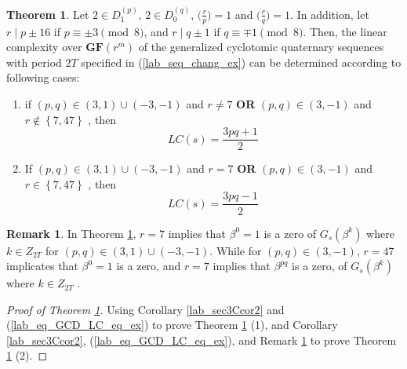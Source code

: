 \documentclass{mcom-l}
\theoremstyle{definition}
\newtheorem{sec3Cremark2}[sec3_remark1]{Remark}
\newtheorem{sec3CThm02}[sec3thm1]{Theorem}
\numberwithin{equation}{section}
\begin{document}
       \begin{sec3CThm02}\label{lab_sec3CThm02}
         Let $ 2\in D_{1}^{(p)} $, $ 2\in D_{0}^{(q)} $, $ \bigl(\tfrac{r}{p}\bigr) =1$ and $ \bigl(\tfrac{r}{q}\bigr) =1$. In addition, let  $ r\mid p\pm 16 $ if $ p\equiv\pm 3\pmod 8 $, and $ r\mid q\pm 1 $ if $ q\equiv\mp 1\pmod 8 $.
         Then, the linear complexity over $ \mathbf{GF}(r^{m}) $ of the generalized cyclotomic quaternary sequences with period $ 2T $ specified in (\ref{lab_seq_chang_ex}) can be determined according to following cases: 
      \begin{enumerate} \item if $ (p,q)\in (3,1)\cup (-3,-1) $ and  $r\ne 7$ \textbf{OR} $ (p,q)\in (3,-1) $ and $r\notin \left\lbrace 7,47\right\rbrace$ , then 
      \begin{equation*}
       LC(s)=\frac{3pq+1}{2}
       \end{equation*}
      
        \item If $ (p,q)\in (3,1)\cup (-3,-1) $ and  $r=7$ \textbf{OR} $ (p,q)\in (3,-1) $ and $r\in \left\lbrace 7,47\right\rbrace$ , then 
    \begin{equation*}
       LC(s)=\frac{3pq-1}{2}
       \end{equation*}
      
    \end{enumerate}
     \end{sec3CThm02}
     \begin{sec3Cremark2}\label{Lab_sec3Cremark2}
     In Theorem \ref{lab_sec3CThm02},  $r=7$ implies that $ \beta^{0}=1 $ is a zero of $ G_{s}(\beta^{k}) $ where $ k\in Z_{2T} $ for $ (p,q)\in (3,1)\cup (-3,-1) $. While for $ (p,q)\in (3,-1) $, $r=47$ implicates that $ \beta^{0}=1 $ is a zero, and $r=7$ implies that $ \beta^{pq}$ is a zero, of $ G_{s}(\beta^{k}) $ where $ k\in Z_{2T} $ .
     \end{sec3Cremark2}
     \begin{proof}[Proof of Theorem \ref{lab_sec3CThm02}]
         Using Corollary \ref{lab_sec3Ccor2} and (\ref{lab_eq_GCD_LC_eq_ex}) to prove Theorem \ref{lab_sec3CThm02} (1), and  Corollary \ref{lab_sec3Ccor2}, (\ref{lab_eq_GCD_LC_eq_ex}), and Remark \ref{Lab_sec3Cremark2} to prove Theorem \ref{lab_sec3CThm02} (2).
         \end{proof}
     
\end{document}
